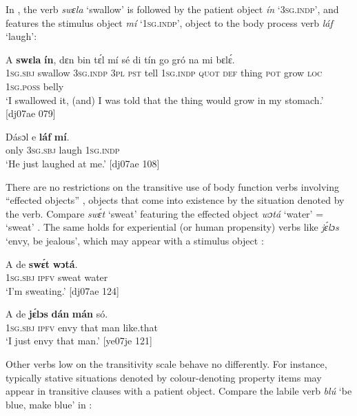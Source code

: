 In , the verb \textit{swɛla} ‘swallow’ is followed by the patient object \textit{ín} ‘\textsc{3sg.indp}’, and  features the stimulus object \textit{mí} ‘\textsc{1sg.indp}’, object to the body process verb \textit{láf} ‘laugh’: 



\ea%
    \label{ex:key:1101}
    \gll A    \textbf{swɛla}  \textbf{ín},    dɛn  bin  tɛ́l  mí    sé
di  tín    go  gró  na  mi    bɛlɛ́.\\
\textsc{1sg.sbj}  swallow  \textsc{3sg.indp}  \textsc{3pl}  \textsc{pst}  tell  \textsc{1sg.indp}  \textsc{quot}
\textsc{def}  thing  \textsc{pot} grow  \textsc{loc}  \textsc{1sg.poss}  belly\\

\glt ‘I swallowed it, (and) I was told that the thing would grow in my stomach.’ [dj07ae 079]
\z


\ea%
    \label{ex:key:1102}
    \gll Dásɔl  e    \textbf{láf}    \textbf{mí}.\\
only    \textsc{3sg.sbj}  laugh  \textsc{1sg.indp}\\

\glt ‘He just laughed at me.’ [dj07ae 108]
\z

There are no restrictions on the transitive use of body function verbs involving “effected objects{\fff}” \citep{Hopper1985}, objects that come into existence by the situation denoted by the verb. Compare \textit{swɛ́t} ‘sweat’ featuring the effected object{\fff} \textit{wɔtá} ‘water’ = ‘sweat’ . The same holds for experiential (or human propensity) verbs like \textit{jɛ́lɔs} ‘envy, be jealous’, which may appear with a stimulus object : 


\ea%
    \label{ex:key:1103}
    \gll A    de    \textbf{swɛ́t}  \textbf{wɔtá}.\\
\textsc{1sg.sbj}  \textsc{ipfv}    sweat  water\\

\glt ‘I’m sweating.’ [dj07ae 124]
\z


\ea%
    \label{ex:key:1104}
    \gll A    de  \textbf{jɛ́lɔs}  \textbf{dán}    \textbf{mán}  só.\\
\textsc{1sg.sbj}  \textsc{ipfv}  envy  that    man    like.that\\

\glt ‘I just envy that man.’ [ye07je 121]
\z

Other verbs low on the transitivity scale behave no differently. For instance, typically stative situations denoted by colour-denoting property items may appear in transitive clauses with a patient object. Compare the labile verb \textit{blú} ‘be blue, make blue’ in :


